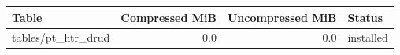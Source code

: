 {\small
\begin{tabular}{lrrl}
\hline
Table & Compressed MiB & Uncompressed MiB & Status \\
\hline
tables/pt\_htr\_drud & 0.0 & 0.0 & installed \\
\hline
\end{tabular}
}
